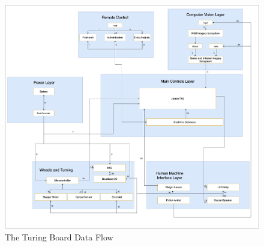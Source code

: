 
\begin{figure}[h!]
	\centering
 	\includegraphics[width=\textwidth]{images/data_flow}
 \caption{The Turing Board Data Flow}
\end{figure}
